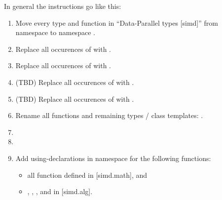 In general the instructions go like this:
\begin{enumerate}
  \item Move every type and function in “Data-Parallel types [simd]” from
    namespace  to namespace \std{}.

  \item Replace all occurences of  with
    .

  \item Replace all occurences of  with .

  \item (TBD) Replace all occurences of  with .

  \item (TBD) Replace all occurences of  with .

  \item Rename all functions and remaining types / class templates: .

  \item {}

  \item {}

  \item Add using-declarations in namespace  for the following functions:
    \begin{itemize}
      \item all function defined in [simd.math], and
      \item {}, , , and  in [simd.alg].
    \end{itemize}
\end{enumerate}



